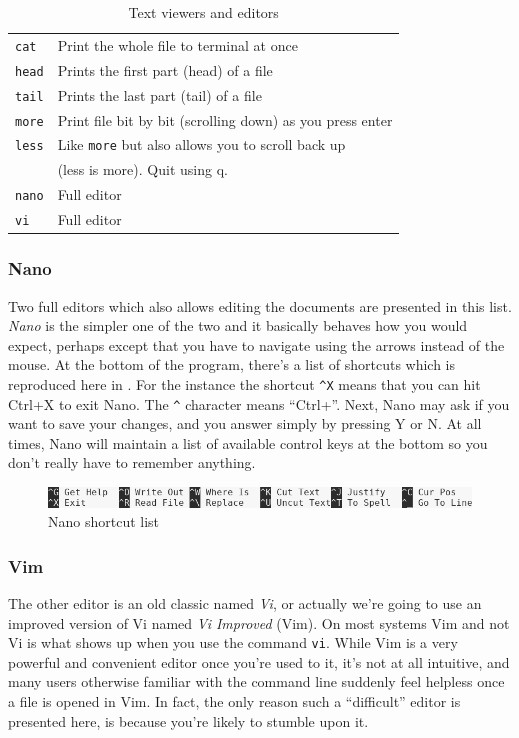 \begin{table}
	\centering
	\caption{Text viewers and editors}
	\begin{tabular}{ll}
	\hline
	\verb|cat|		&	Print the whole file to terminal at once 	\\
	\verb|head|		&	Prints the first part (head) of a file \\
	\verb|tail|		&	Prints the last part (tail) of a file	 \\	
	\verb|more|		&	Print file bit by bit (scrolling down) as you press enter	\\
	\verb|less|		&	Like \verb|more| but also allows you to scroll back up\\& (less is more). Quit using q. \\	
	\hline
	\verb|nano|		&	Full editor \\
	\verb|vi|		&	Full editor
	\end{tabular}
	\label{tab:bash:editors}
\end{table}

\subsubsection{Nano}
Two full editors which also allows editing the documents are presented in this list. \emph{Nano} is the simpler one of the two and it basically behaves how you would expect, perhaps except that you have to navigate using the arrows instead of the mouse. At the bottom of the program, there's a list of shortcuts which is reproduced here in . For the instance the shortcut \verb|^X| means that you can hit Ctrl+X to exit Nano. The \verb|^| character means ``Ctrl+''. Next, Nano may ask if you want to save your changes, and you answer simply by pressing Y or N. At all times, Nano will maintain a list of available control keys at the bottom so you don't really have to remember anything.

\begin{figure}
	\centering
	\includegraphics[width=\textwidth]{graphics/nano.png}
	\caption{Nano shortcut list}
	\label{fig:bash:nano}
\end{figure}

\subsubsection{Vim}
The other editor is an old classic named \emph{Vi}, or actually we're going to use an improved version of Vi named \emph{Vi Improved} (Vim). On most systems Vim and not Vi is what shows up when you use the command \verb|vi|. While Vim is a very powerful and convenient editor once you're used to it, it's not at all intuitive, and many users otherwise familiar with the command line suddenly feel helpless once a file is opened in Vim. In fact, the only reason such a ``difficult'' editor is presented here, is because you're likely to stumble upon it.

